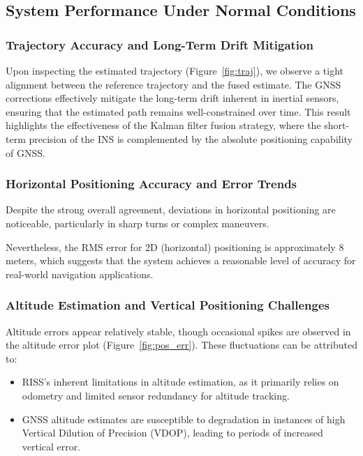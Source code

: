 \documentclass[conference]{IEEEtran}
\begin{document}
\subsection{System Performance Under Normal Conditions}

\subsubsection{Trajectory Accuracy and Long-Term Drift Mitigation}
Upon inspecting the estimated trajectory (Figure~\ref{fig:traj}), we observe a tight alignment between the reference trajectory and the fused estimate. The GNSS corrections effectively mitigate the long-term drift inherent in inertial sensors, ensuring that the estimated path remains well-constrained over time. This result highlights the effectiveness of the Kalman filter fusion strategy, where the short-term precision of the INS is complemented by the absolute positioning capability of GNSS.

\subsubsection{Horizontal Positioning Accuracy and Error Trends}
Despite the strong overall agreement, deviations in horizontal positioning are noticeable, particularly in sharp turns or complex maneuvers.

Nevertheless, the RMS error for 2D (horizontal) positioning is approximately 8 meters, which suggests that the system achieves a reasonable level of accuracy for real-world navigation applications.

\subsubsection{Altitude Estimation and Vertical Positioning Challenges}
Altitude errors appear relatively stable, though occasional spikes are observed in the altitude error plot (Figure~\ref{fig:pos_err}). These fluctuations can be attributed to:
\begin{itemize}
    \item RISS's inherent limitations in altitude estimation, as it primarily relies on odometry and limited sensor redundancy for altitude tracking.
    \item GNSS altitude estimates are susceptible to degradation in instances of high Vertical Dilution of Precision (VDOP), leading to periods of increased vertical error.
\end{itemize}
\end{document}
